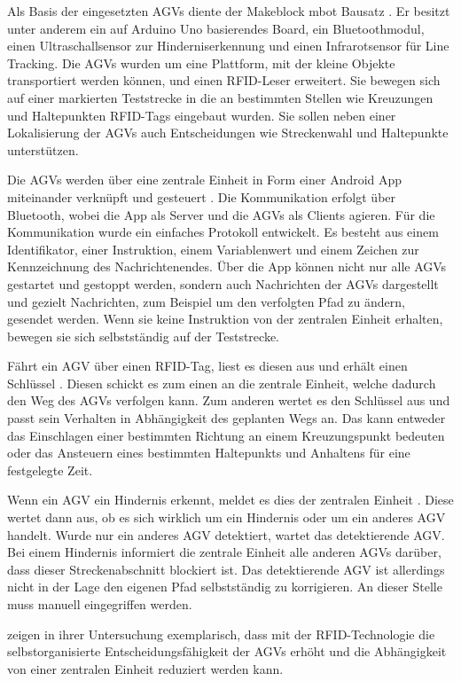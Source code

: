 Als Basis der eingesetzten AGVs diente der Makeblock mbot Bausatz \parencite{rfid}. Er besitzt unter anderem ein auf Arduino Uno basierendes Board, ein Bluetoothmodul, einen Ultraschallsensor zur Hinderniserkennung und einen Infrarotsensor für Line Tracking. Die AGVs wurden um eine Plattform, mit der kleine Objekte transportiert werden können, und einen RFID-Leser erweitert. Sie bewegen sich auf einer markierten Teststrecke in die an bestimmten Stellen wie Kreuzungen und Haltepunkten RFID-Tags eingebaut wurden. Sie sollen neben einer Lokalisierung der AGVs auch Entscheidungen wie Streckenwahl und Haltepunkte unterstützen.

Die AGVs werden über eine zentrale Einheit in Form einer Android App miteinander verknüpft und gesteuert \parencite{rfid}. Die Kommunikation erfolgt über Bluetooth, wobei die App als Server und die AGVs als Clients agieren. Für die Kommunikation wurde ein einfaches Protokoll entwickelt. Es besteht aus einem Identifikator, einer Instruktion, einem Variablenwert und einem Zeichen zur Kennzeichnung des Nachrichtenendes. Über die App können nicht nur alle AGVs gestartet und gestoppt werden, sondern auch Nachrichten der AGVs dargestellt und gezielt Nachrichten, zum Beispiel um den verfolgten Pfad zu ändern, gesendet werden. Wenn sie keine Instruktion von der zentralen Einheit erhalten, bewegen sie sich selbstständig auf der Teststrecke.

Fährt ein AGV über einen RFID-Tag, liest es diesen aus und erhält einen Schlüssel \parencite{rfid}. Diesen schickt es zum einen an die zentrale Einheit, welche dadurch den Weg des AGVs verfolgen kann. Zum anderen wertet es den Schlüssel aus und passt sein Verhalten in Abhängigkeit des geplanten Wegs an. Das kann entweder das Einschlagen einer bestimmten Richtung an einem Kreuzungspunkt bedeuten oder das Ansteuern eines bestimmten Haltepunkts und Anhaltens für eine festgelegte Zeit.

Wenn ein AGV ein Hindernis erkennt, meldet es dies der zentralen Einheit \parencite{rfid}. Diese wertet dann aus, ob es sich wirklich um ein Hindernis oder um ein anderes AGV handelt. Wurde nur ein anderes AGV detektiert, wartet das detektierende AGV. Bei einem Hindernis informiert die zentrale Einheit alle anderen AGVs darüber, dass dieser Streckenabschnitt blockiert ist. Das detektierende AGV ist allerdings nicht in der Lage den eigenen Pfad selbstständig zu korrigieren. An dieser Stelle muss manuell eingegriffen werden. 

\textcite{rfid} zeigen in ihrer Untersuchung exemplarisch, dass mit der RFID-Technologie die selbstorganisierte Entscheidungsfähigkeit der AGVs erhöht und die Abhängigkeit von einer zentralen Einheit reduziert werden kann.
